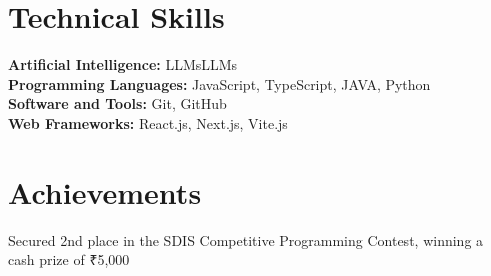 %
\section{Technical Skills}
%
\textbf{Artificial Intelligence:} LLMsLLMs \\ %
%
\textbf{Programming Languages:} JavaScript, TypeScript, JAVA, Python \\ %
%
\textbf{Software and Tools:} Git, GitHub \\ %
%
\textbf{Web Frameworks:} React.js, Next.js, Vite.js%
%






%
\section{Achievements}
Secured 2nd place in the SDIS Competitive Programming Contest, winning a cash prize of ₹5,000



